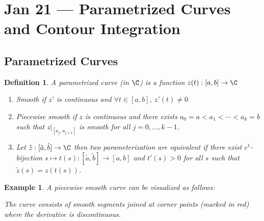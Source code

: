 \documentclass[a4paper]{article}
\newtheorem{defn}[thm]{Definition}
\newtheorem{eg}[thm]{Example}
\begin{document}
\section{Jan 21 --- Parametrized Curves and Contour Integration}
\subsection{Parametrized Curves}
\begin{defn}
    A parametrized curve (in $\C$) is a function $z(t):[a,b]\to \C$
    \begin{enumerate}
        \item Smooth if $z'$ is continuous and $\forall t\in [a,b]$, $z'(t)\neq 0$
        \item Piecewise smooth if $z$ is continuous and there exists $a_0=a<a_1<\cdots<a_k=b$ such that $z|_{[a_j,a_{j+1}]}$ is smooth for all $j=0,\ldots,k-1$. 
        \item Let $\tilde{z}:[\tilde{a},\tilde{b}]\to \C$ then two parameterization are equivalent if there exist $c^1$-bijection $s\mapsto t(s):[\tilde{a},\tilde{b}]\to [a,b]$ and $t'(s)>0$ for all $s$ such that $\tilde{z}(s)=z(t(s))$.
    \end{enumerate}
\end{defn}
    \begin{eg}
        A piecewise smooth curve can be visualized as follows:
        \begin{center}
        \end{center}
        The curve consists of smooth segments joined at corner points (marked in red) where the derivative is discontinuous.
    \end{eg}
\end{document}
